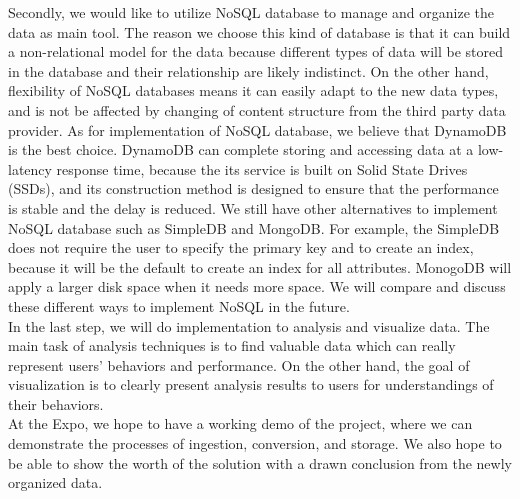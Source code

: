 \documentclass[letterpaper,10pt]{article}
\begin{document}
    \noindent Secondly, we would like to utilize NoSQL database to manage and organize the data as main tool. The reason we choose this kind of database is that it can build a non-relational model for the data because different types of data will be stored in the database and their relationship are likely indistinct. On the other hand, flexibility of NoSQL databases means it can easily adapt to the new data types, and is not be affected by changing of content structure from the third party data provider. As for implementation of NoSQL database, we believe that DynamoDB is the best choice. DynamoDB can complete storing and accessing data at a low-latency response time, because the its service is built on Solid State Drives (SSDs), and its construction method is designed to ensure that the performance is stable and the delay is reduced. We still have other alternatives to implement NoSQL database such as SimpleDB and MongoDB. For example, the SimpleDB does not require the user to specify the primary key and to create an index, because it will be the default to create an index for all attributes. MonogoDB will apply a larger disk space when it needs more space. We will compare and discuss these different ways to implement NoSQL in the future.\\
 
    \noindent In the last step, we will do implementation to analysis and visualize data. The main task of analysis techniques is to find valuable data which can really represent users’ behaviors and performance. On the other hand, the goal of visualization is to clearly present analysis results to users for understandings of their behaviors.\\
 
    \noindent At the Expo, we hope to have a working demo of the project, where we can demonstrate the processes of ingestion, conversion, and storage. We also hope to be able to show the worth of the solution with a drawn conclusion from the newly organized data.
\end{document}
